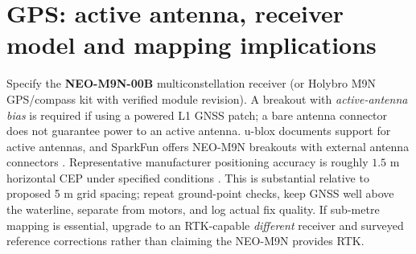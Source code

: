\documentclass[10pt,a4paper]{article}
\begin{document}
\section{GPS: active antenna, receiver model and mapping implications}
Specify the \textbf{NEO-M9N-00B} multiconstellation receiver (or Holybro M9N GPS/compass kit with verified module revision). A breakout with \emph{active-antenna bias} is required if using a powered L1 GNSS patch; a bare antenna connector does not guarantee power to an active antenna. u-blox documents support for active antennas, and SparkFun offers NEO-M9N breakouts with external antenna connectors \cite{M9N,SparkM9N}. Representative manufacturer positioning accuracy is roughly $1.5$ m horizontal CEP under specified conditions \cite{M9N}. This is substantial relative to proposed 5 m grid spacing; repeat ground-point checks, keep GNSS well above the waterline, separate from motors, and log actual fix quality. If sub-metre mapping is essential, upgrade to an RTK-capable \emph{different} receiver and surveyed reference corrections rather than claiming the NEO-M9N provides RTK.
\end{document}
